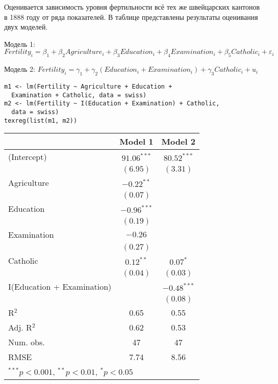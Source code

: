 \begin{problem} %
Оценивается зависимость уровня фертильности всё тех же швейцарских кантонов в 1888 году от ряда показателей. В таблице представлены результаты оценивания двух моделей.

Модель 1: $Fertility_i=\beta_1+\beta_2 Agriculture_i+\beta_3 Education_i+\beta_4 Examination_i+\beta_5 Catholic_i+\varepsilon_i$

Модель 2: $Fertility_i=\gamma_1+\gamma_2 (Education_i+Examination_i)+\gamma_3 Catholic_i+u_i$

\begin{verbatim}
m1 <- lm(Fertility ~ Agriculture + Education +
  Examination + Catholic, data = swiss)
m2 <- lm(Fertility ~ I(Education + Examination) + Catholic,
  data = swiss)
texreg(list(m1, m2))
\end{verbatim}


\begin{tabular}{l c c }
\hline
 & Model 1 & Model 2 \\
\hline
(Intercept)                & $91.06^{***}$ & $80.52^{***}$ \\
                           & $(6.95)$      & $(3.31)$      \\
Agriculture                & $-0.22^{**}$  &               \\
                           & $(0.07)$      &               \\
Education                  & $-0.96^{***}$ &               \\
                           & $(0.19)$      &               \\
Examination                & $-0.26$       &               \\
                           & $(0.27)$      &               \\
Catholic                   & $0.12^{**}$   & $0.07^{*}$    \\
                           & $(0.04)$      & $(0.03)$      \\
I(Education + Examination) &               & $-0.48^{***}$ \\
                           &               & $(0.08)$      \\
\hline
R$^2$                      & 0.65          & 0.55          \\
Adj. R$^2$                 & 0.62          & 0.53          \\
Num. obs.                  & 47            & 47            \\
RMSE                       & 7.74          & 8.56          \\
\hline
\multicolumn{3}{l}{\scriptsize{$^{***}p<0.001$, $^{**}p<0.01$, $^*p<0.05$}}
\end{tabular}




\end{problem}
